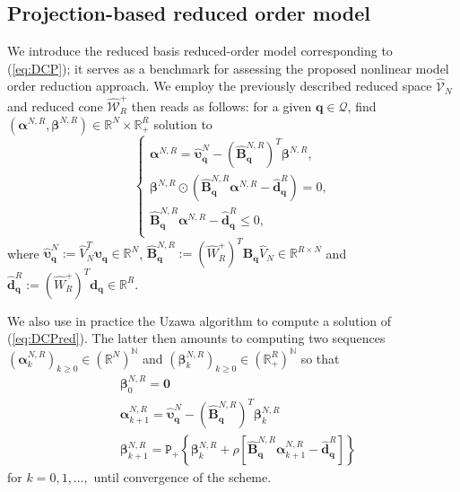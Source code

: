 \subsection{Projection-based reduced order model}
We introduce the reduced basis reduced-order model corresponding to (\ref{eq:DCP}); it serves as a benchmark for assessing the proposed nonlinear model order reduction approach.
We employ the previously described reduced space $\hat{\mathcal V}_N$ and reduced cone $\hat{\mathcal W}_R^+$ then reads as follows: for a given $\mathbf{q}\in \mathcal Q$, find $(\boldsymbol{\alpha}^{N,R}, \boldsymbol{\beta}^{N,R})\in \mathbb{R}^{N} \times \mathbb{R}_+^{R}$ solution to 
\begin{equation}
\left\{
\begin{array}{l}
\boldsymbol{\alpha}^{N,R} = \hat{\boldsymbol{\upsilon}}_{\mathbf{q}}^N - (\hat{\mathbf{B}}^{N,R}_{\mathbf{q}})^T \boldsymbol{\beta}^{N,R},\\
\boldsymbol{\beta}^{N,R} \odot (\hat{\mathbf{B}}^{N,R}_{\mathbf{q}}\boldsymbol{\alpha}^{N,R} - \hat{\mathbf{d}}_{\mathbf{q}}^R) = 0,\\
\hat{\mathbf{B}}^{N,R}_{\mathbf{q}}\boldsymbol{\alpha}^{N,R} - \hat{\mathbf{d}}_{\mathbf{q}}^R \leq 0, \\
\end{array}
\right. 
\label{eq:DCPred}
\end{equation}
where
$
\hat{\boldsymbol{\upsilon}}_{\mathbf{q}}^N:= \hat{V}_N^T\boldsymbol{\upsilon}_{\mathbf{q}}
\in\mathbb{R}^N$, $\hat{\mathbf{B}}^{N,R}_{\mathbf{q}}:= (\hat{W}_R^+)^T \mathbf{B}_{\mathbf{q}}\hat{V}_N \in \mathbb{R}^{R\times N}$ and $\hat{\mathbf{d}}_{\mathbf{q}}^R:= (\hat{W}_R^+)^T\mathbf{d}_{\mathbf{q}} \in \mathbb{R}^R
$.

\medskip

We also use in practice the Uzawa algorithm to compute a solution of (\ref{eq:DCPred}). The latter then amounts to computing two sequences $(\boldsymbol{\alpha}^{N,R}_k)_{k\geq 0} \in (\mathbb{R}^{N})^{\mathbb{N}}$ and
$(\boldsymbol{\beta}^{N,R}_k)_{k\geq 0} \in (\mathbb{R}_{+}^{R})^{\mathbb{N}}$ so that
\begin{align}
\label{eq:DCM_ROM1}
    & \boldsymbol{\beta}^{N,R}_0 =\mathbf{0}\\
    & \boldsymbol{\alpha}^{N,R}_{k+1}=\hat{\boldsymbol{\upsilon}}_{\mathbf{q}}^N-(\hat{\mathbf{B}}^{N,R}_{\mathbf{q}})^T \boldsymbol{\beta}^{N,R}_k \label{eq:DCM_ROM2}\\
    & \boldsymbol{\beta}^{N,R}_{k+1}=\texttt{P}_+\left\{
    \boldsymbol{\beta}^{N,R}_k+\rho \left[
    \hat{\mathbf{B}}^{N,R}_{\mathbf{q}}\boldsymbol{\alpha}^{N,R}_{k+1}-\hat{\mathbf{d}}_{\mathbf{q}}^R
    \right]
    \right\} \label{eq:DCM_ROM3}
\end{align}
for $k=0,1,\ldots,$ until convergence of the scheme. 

